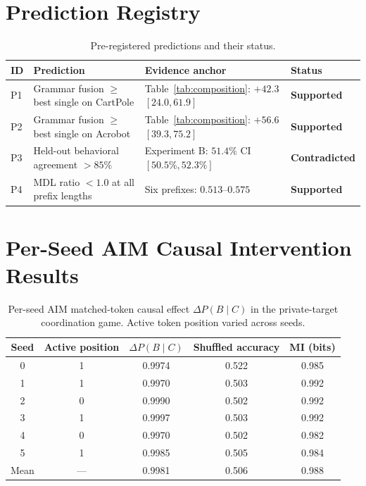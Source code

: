 \documentclass[12pt]{article}
\begin{document}
\appendix
\section{Prediction Registry}
\label{app:predictions}

\begin{table}[h]
\centering
\caption{Pre-registered predictions and their status.}
\label{tab:predictions}
\begin{tabular}{llp{5cm}l}
\toprule
ID & Prediction & Evidence anchor & Status \\
\midrule
P1 & Grammar fusion $\ge$ best single on CartPole
   & Table~\ref{tab:composition}: $+42.3$ $[24.0, 61.9]$
   & \textbf{Supported} \\[4pt]
P2 & Grammar fusion $\ge$ best single on Acrobot
   & Table~\ref{tab:composition}: $+56.6$ $[39.3, 75.2]$
   & \textbf{Supported} \\[4pt]
P3 & Held-out behavioral agreement $> 85\%$
   & Experiment B: $51.4\%$ CI $[50.5\%, 52.3\%]$
   & \textbf{Contradicted} \\[4pt]
P4 & MDL ratio $< 1.0$ at all prefix lengths
   & Six prefixes: $0.513$--$0.575$
   & \textbf{Supported} \\
\bottomrule
\end{tabular}
\end{table}

\section{Per-Seed AIM Causal Intervention Results}
\label{app:aim}

\begin{table}[h]
\centering
\caption{Per-seed AIM matched-token causal effect
  $\Delta P(B \mid C)$ in the private-target coordination game.
  Active token position varied across seeds.}
\label{tab:aim}
\begin{tabular}{ccccc}
\toprule
Seed & Active position & $\Delta P(B \mid C)$ & Shuffled accuracy & MI (bits) \\
\midrule
0 & 1 & 0.9974 & 0.522 & 0.985 \\
1 & 1 & 0.9970 & 0.503 & 0.992 \\
2 & 0 & 0.9990 & 0.502 & 0.992 \\
3 & 1 & 0.9997 & 0.503 & 0.992 \\
4 & 0 & 0.9970 & 0.502 & 0.982 \\
5 & 1 & 0.9985 & 0.505 & 0.984 \\
\midrule
Mean & --- & 0.9981 & 0.506 & 0.988 \\
\bottomrule
\end{tabular}
\end{table}
\end{document}
